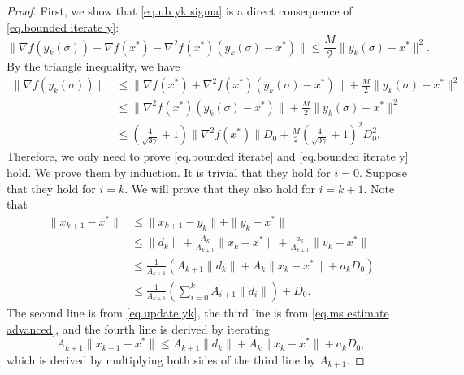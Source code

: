 \documentclass{mcom-l}
\numberwithin{equation}{section}
\begin{document}
\begin{proof}
    First, we show that \eqref{eq.ub yk sigma} is a direct consequence of \eqref{eq.bounded iterate y}:
    \begin{equation*}
        \|\nabla f(y_k(\sigma)) - \nabla f(x^*) -\nabla^2 f(x^*)(y_k(\sigma)-x^*)\| \leq \frac{M}{2}\|y_k(\sigma)-x^*\|^2.
    \end{equation*}
    By the triangle inequality, we have
    \begin{equation*}
        \begin{aligned}
            \|\nabla f(y_k(\sigma)) \| & \leq \|\nabla f(x^*)+\nabla^2 f(x^*)(y_k(\sigma)-x^*)\| +\frac{M}{2}\|y_k(\sigma)-x^*\|^2                                       \\
                                       & \leq \|\nabla^2 f(x^*)(y_k(\sigma)-x^*)\|+\frac{M}{2}\|y_k(\sigma)-x^*\|^2                                                      \\
                                       & \leq \left(\frac{4}{\sqrt{3\gamma}}+1\right)\|\nabla ^2 f(x^*)\|D_0+\frac{M}{2}\left(\frac{4}{\sqrt{3\gamma}}+1\right)^2 D_0^2.
        \end{aligned}
    \end{equation*}
    Therefore, we only need to prove \eqref{eq.bounded iterate} and \eqref{eq.bounded iterate y} hold. We prove them by induction. It is trivial that they hold for $i=0$. Suppose that they hold for $i=k$. We will prove that they also hold for $i=k+1$. Note that
    \begin{equation*}
        \begin{aligned}
            \|x_{k+1}-x^*\| & \leq \|x_{k+1}-y_k\| + \|y_k-x^*\|                                            \\
                            & \leq \|d_k\|+ \frac{A_k}{A_{k+1}} \|x_k-x^*\| +\frac{a_k}{A_{k+1}}\|v_k-x^*\| \\
                            & \leq \frac{1}{A_{k+1}}\left(A_{k+1}\|d_k\| +A_k\|x_k-x^*\| +  a_k D_0\right)  \\
                            & \leq \frac{1}{A_{k+1}}\left (\sum_{i=0}^k A_{i+1}\|d_i\|\right)+D_0.
        \end{aligned}
    \end{equation*}
    The second line is from \eqref{eq.update yk}, the third line is from \eqref{eq.ms estimate advanced}, and the fourth line is derived by iterating
    \begin{equation*}
        A_{k+1} \|x_{k+1}-x^*\|\leq A_{k+1}\|d_k\|+A_k\|x_k-x^*\|+a_k D_0,
    \end{equation*}
    which is derived by multiplying both sides of the third line by $A_{k+1}$.


\end{proof}
\end{document}

